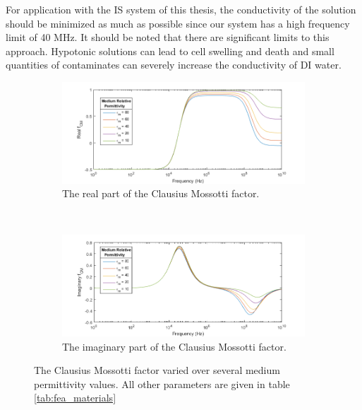 \par For application with the IS system of this thesis, the conductivity of the solution should be minimized as much as possible since our system has a high frequency limit of 40 MHz. It should be noted that there are significant limits to this approach. Hypotonic solutions can lead to cell swelling and death and small quantities of contaminates can severely increase the conductivity of DI water. 

\begin{figure}[h]
    \centering
    \begin{subfigure}[b]{\textwidth}
        \centering
        \includegraphics[width=\textwidth]{images/realFCMvsPermittivity.png}
        \caption{The real part of the Clausius Mossotti factor.}
        \label{}
    \end{subfigure}
    \\
    \vspace{0.1 in}
    \begin{subfigure}[b]{\textwidth}
        \centering
        \includegraphics[width=\textwidth]{images/imaginaryFCMvsPermittivity.png}
        \caption{The imaginary part of the Clausius Mossotti factor.}
    \end{subfigure}
    \caption{The Clausius Mossotti factor varied over several medium permittivity values. All other parameters are given in table \ref{tab:fea_materials}}
    \label{fig:solutionPermittivityOptimizeFCM}
\end{figure}



